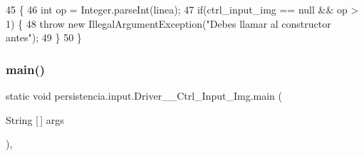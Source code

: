 \begin{DoxyCode}
45                                                                                         \{
46         \textcolor{keywordtype}{int} op = Integer.parseInt(linea);
47         \textcolor{keywordflow}{if}(ctrl\_input\_img == null && op > 1) \{
48             \textcolor{keywordflow}{throw} \textcolor{keyword}{new} IllegalArgumentException(\textcolor{stringliteral}{"Debes llamar al constructor antes"});
49         \}
50     \}
\end{DoxyCode}
\mbox{\label{classpersistencia_1_1input_1_1Driver____Ctrl__Input__Img_afe531cb182d64111aeead5d061965d8f}} 
\subsubsection{\texorpdfstring{main()}{main()}}
{\footnotesize\ttfamily static void persistencia.\+input.\+Driver\+\_\+\+\_\+\+Ctrl\+\_\+\+Input\+\_\+\+Img.\+main (\begin{DoxyParamCaption}\item[{String \mbox{[}$\,$\mbox{]}}]{args }\end{DoxyParamCaption})\hspace{0.3cm}{\ttfamily [inline]}, {\ttfamily [static]}}


